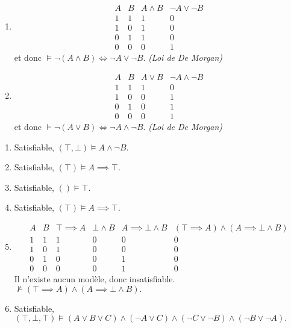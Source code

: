 \documentclass[12pt,french,a4paper]{article}
\begin{document}
\begin{question}
\begin{enumerate}
\item\begin{displaymath}
\begin{array}{cc|ccc}
A & B & A \wedge B &  \neg A \vee \neg B\\
\hline
1 & 1 & 1 & 0\\
1 & 0 & 1 & 0\\
0 & 1 & 1 & 0\\
0 & 0 & 0 & 1
\end{array}
\end{displaymath}
et donc $\vDash  \neg(A \wedge B) \iff  \neg A \vee \neg B.$ \hfill \emph{(Loi de De Morgan)}


\item\begin{displaymath}
\begin{array}{cc|ccc}
A & B & A \vee B &  \neg A \wedge \neg B\\
\hline
1 & 1 & 1 & 0\\
1 & 0 & 0 & 1\\
0 & 1 & 0 & 1\\
0 & 0 & 0 & 1
\end{array}
\end{displaymath}
et donc $\vDash  \neg(A \vee B) \iff  \neg A \wedge \neg B.$ \hfill \emph{(Loi de De Morgan)}

\end{enumerate}
\end{question}

\begin{question}
\begin{enumerate}

\item Satisfiable, $(\top, \bot) \vDash A \wedge \neg B.$
\item Satisfiable, $(\top) \vDash A \implies \top.$
\item Satisfiable, $() \vDash \top.$
\item Satisfiable, $(\top) \vDash A \implies \top.$

\item\begin{displaymath}
\begin{array}{cc|cccc}
A & B & \top \implies A & \bot \wedge B &  A \implies \bot \wedge B &  (\top \implies A) \wedge( A \implies \bot \wedge B) \\
\hline
1 & 1 & 1 & 0 & 0 & 0\\
1 & 0 & 1 & 0 & 0 & 0\\
0 & 1 & 0 & 0 & 1 & 0\\
0 & 0 & 0 & 0 & 1 & 0
\end{array}
\end{displaymath}
Il n'existe aucun modèle, donc insatisfiable. $\not \vDash (\top \implies A) \wedge( A \implies \bot \wedge B).$

\item Satisfiable, $(\top, \bot, \top) \vDash (A \vee B \vee C) \wedge (\neg A \vee C) \wedge (\neg C \vee \neg B) \wedge (\neg B \vee \neg A).$

\end{enumerate}
\end{question}
\end{document}
